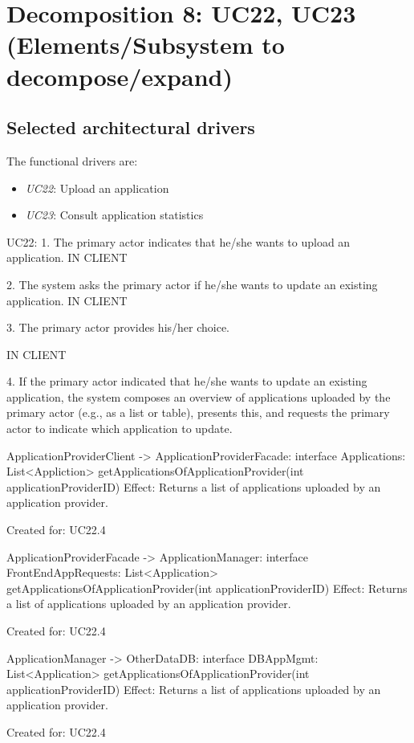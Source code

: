 \section{Decomposition 8: UC22, UC23 (Elements/Subsystem to decompose/expand)}


\subsection{Selected architectural drivers}
    The functional drivers are:
    \begin{itemize}
        \item \emph{UC22}: Upload an application
        \item \emph{UC23}: Consult application statistics
    \end{itemize}

    UC22:
        1. The primary actor indicates that he/she wants to upload an application.
            IN CLIENT

        2. The system asks the primary actor if he/she wants to update an existing application.
            IN CLIENT

        3. The primary actor provides his/her choice.

            IN CLIENT

        4. If the primary actor indicated that he/she wants to update an existing application,
           the system composes an overview of applications uploaded by the primary actor
           (e.g., as a list or table), presents this, and requests the primary actor to indicate which application to update.

            ApplicationProviderClient -> ApplicationProviderFacade: interface Applications: List<Appliction> getApplicationsOfApplicationProvider(int applicationProviderID)
                Effect: Returns a list of applications uploaded by an application provider.
                \item Created for: UC22.4

            ApplicationProviderFacade -> ApplicationManager: interface FrontEndAppRequests: List<Application> getApplicationsOfApplicationProvider(int applicationProviderID)
                Effect: Returns a list of applications uploaded by an application provider.
                \item Created for: UC22.4

            ApplicationManager -> OtherDataDB: interface DBAppMgmt: List<Application> getApplicationsOfApplicationProvider(int applicationProviderID)
                Effect: Returns a list of applications uploaded by an application provider.
                \item Created for: UC22.4


